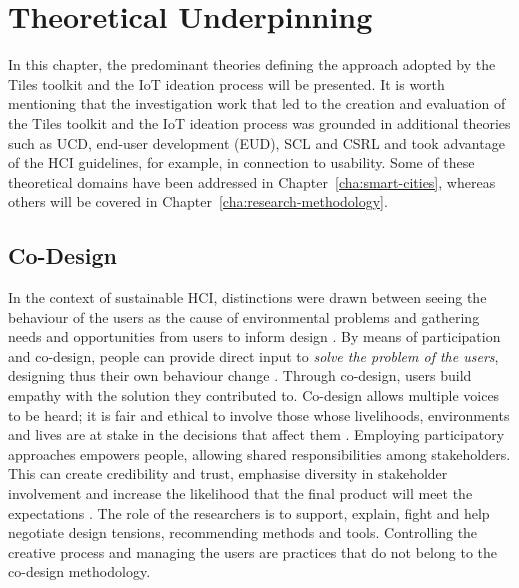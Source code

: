 \chapter{Theoretical Underpinning}
\label{cha:theory}


In this chapter, the predominant theories defining the approach adopted by the Tiles toolkit and the IoT ideation process will be presented. It is worth mentioning that the investigation work that led to the creation and evaluation of the Tiles toolkit and the IoT ideation process was grounded in additional theories such as UCD, end-user development (EUD), SCL and CSRL and took advantage of the HCI guidelines, for example, in connection to usability. Some of these theoretical domains have been addressed in Chapter~\ref{cha:smart-cities}, whereas others will be covered in Chapter~\ref{cha:research-methodology}.


\section{Co-Design}

In the context of sustainable HCI, distinctions were drawn between seeing the behaviour of the users as the cause of environmental problems and gathering needs and opportunities from users to inform design \autocite{disalvo_mapping_2010}. By means of participation and co-design, people can provide direct input to \textit{solve the problem of the users}, designing thus their own behaviour change \autocite{lockton_designing_2014}.
Through co-design, users build empathy with the solution they contributed to. Co-design allows multiple voices to be heard; it is fair and ethical to involve those whose livelihoods, environments and lives are at stake in the decisions that affect them \autocite{perlgut_community_2005}.
Employing participatory approaches empowers people, allowing shared responsibilities among stakeholders. This can create credibility and trust, emphasise diversity in stakeholder involvement and increase the likelihood that the final product will meet the expectations \autocite{pettersen_ethics_2008}. The role of the researchers is to support, explain, fight and help negotiate design tensions, recommending methods and tools. Controlling the creative process and managing the users are practices that do not belong to the co-design methodology.

